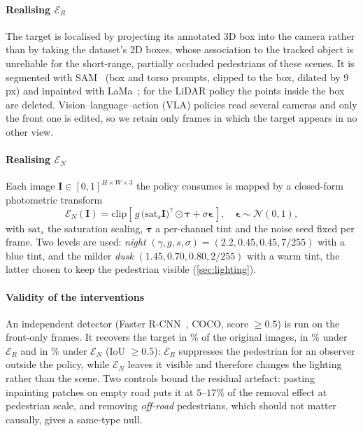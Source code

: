 \paragraph{Realising $\mathcal{E}_R$}
The target is localised by projecting its annotated 3D box into the camera rather than by taking the
dataset's 2D boxes, whose association to the tracked object is unreliable for the short-range,
partially occluded pedestrians of these scenes. It is segmented with SAM~\cite{kirillov2023sam} (box
and torso prompts, clipped to the box, dilated by $9$\,px) and inpainted with
LaMa~\cite{suvorov2022lama}; for the LiDAR policy the points inside the box are deleted. Vision--language--action (VLA) policies read several cameras and only the front one is edited, so we retain only frames in which the target
appears in no other view.

\paragraph{Realising $\mathcal{E}_N$}
Each image $\mathbf{I}\in[0,1]^{H\times W\times3}$ the policy consumes is mapped by a closed-form
photometric transform
\begin{equation}
\mathcal{E}_N(\mathbf{I})=\mathrm{clip}\!\left[\,g\,\big(\mathrm{sat}_{s}\mathbf{I}\big)^{\gamma}\odot\boldsymbol\tau+\sigma\boldsymbol\epsilon\,\right],
\quad \boldsymbol\epsilon\sim\mathcal{N}(0,1),
\label{eq:relight}
\end{equation}
with $\mathrm{sat}_s$ the saturation scaling, $\boldsymbol\tau$ a per-channel tint and the noise seed
fixed per frame. Two levels are used: \emph{night} $(\gamma,g,s,\sigma)=(2.2,0.45,0.45,7/255)$ with a
blue tint, and the milder \emph{dusk} $(1.45,0.70,0.80,2/255)$ with a warm tint, the latter chosen to
keep the pedestrian visible (\cref{sec:lighting}).

\paragraph{Validity of the interventions}
An independent detector (Faster R-CNN~\cite{ren2015faster}, COCO, score $\ge0.5$) is run on the
\NumDetN{} front-only frames. It recovers the target in \NumDetOrig\% of the original images, in
\NumDetStill\% under $\mathcal{E}_R$ and in \NumDetNight\% under $\mathcal{E}_N$ (IoU $\ge0.5$):
$\mathcal{E}_R$ suppresses the pedestrian for an observer outside the policy, while $\mathcal{E}_N$
leaves it visible and therefore changes the lighting rather than the scene. Two controls bound the
residual artefact: pasting inpainting patches on empty road puts it at $5$--$17\%$ of the removal
effect at pedestrian scale, and removing \emph{off-road} pedestrians, which should not matter
causally, gives a same-type null.

